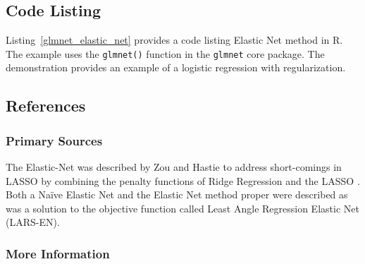 \subsection{Code Listing}
Listing~\ref{glmnet_elastic_net} provides a code listing Elastic Net method in R.
The example uses the \texttt{glmnet()} function in the \texttt{glmnet} core package. The demonstration provides an example of a logistic regression with regularization.






\subsection{References}

\subsubsection{Primary Sources}
The Elastic-Net was described by Zou and Hastie to address short-comings in LASSO by combining the penalty functions of Ridge Regression and the LASSO \cite{Zou2005}. Both a Na\"ive Elastic Net and the Elastic Net method proper were described as was a solution to the objective function called Least Angle Regression Elastic Net (LARS-EN).

\subsubsection{More Information}



